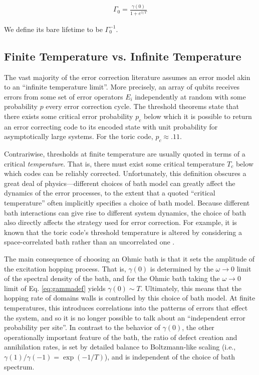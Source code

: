 \documentclass[twocolumn,superscriptaddress,aps,prb,floatfix]{revtex4-1}
\begin{document}
\begin{align}
\Gamma_0 = \frac{\gamma(0)}{1+e^{1/T}} 
\end{align}

We define its bare lifetime to be $\Gamma_0^{-1}$.

\subsection{Finite Temperature vs. Infinite Temperature}
\label{sec:temperature}

 The vast majority of the error correction literature assumes an error model akin to an ``infinite temperature limit''.  More precisely, an array of qubits receives errors from some set of error operators ${E_i}$ independently at random with some probability $p$ every error correction cycle.  The threshold theorems state that there exists some critical error probability $p_c$ below which it is possible to return an error correcting code to its encoded state with unit probability for asymptotically large systems.  For the toric code, $p_c\approx.11$.
 
 Contrariwise, thresholds at finite temperature are usually quoted in terms of a critical \emph{temperature}.  That is, there must exist some critical temperature $T_c$ below which codes can be reliably corrected.  Unfortunately, this definition obscures a great deal of physics---different choices of bath model can greatly affect the dynamics of the error processes, to the extent that a quoted ``critical temperature'' often implicitly specifies a choice of bath model.  Because different bath interactions can give rise to different system dynamics, the choice of bath also directly affects the strategy used for error correction.  For example, it is known that the toric code's threshold temperature is altered by considering a space-correlated bath rather than an uncorrelated one \cite{Novais2013}.
 
 The main consequence of choosing an Ohmic bath is that it sets the amplitude of the excitation hopping process.  That is, $\gamma(0)$ is determined by the $\omega \rightarrow 0$ limit of the spectral density of the bath, and for the Ohmic bath taking the $\omega\rightarrow0$ limit of  Eq. \ref{eq:gammadef} yields $\gamma(0) \sim T$. 
Ultimately, this means that the hopping rate of domains walls is controlled by this choice of bath model. At finite temperatures, this introduces correlations into the patterns of errors that effect the system, and so it is no longer possible to talk about an ``independent error probability per site''. 
In contrast to the behavior of $\gamma(0)$, 
the other operationally important feature of the bath, the ratio of defect creation and annihilation rates, is set by detailed balance to Boltzmann-like scaling (i.e., $\gamma(1)/\gamma(-1) = \exp(-1/T)$), and is independent of the choice of bath spectrum.
 
\end{document}
